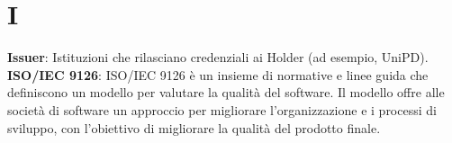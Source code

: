 \section{I}
\textbf{Issuer}: Istituzioni che rilasciano credenziali ai Holder (ad esempio, UniPD).\\
\textbf{ISO/IEC 9126}: ISO/IEC 9126 è un insieme di normative e linee guida che definiscono un modello per valutare la qualità del software. Il modello offre alle società di software un approccio per migliorare l'organizzazione e i processi di sviluppo, con l'obiettivo di migliorare la qualità del prodotto finale.\\

